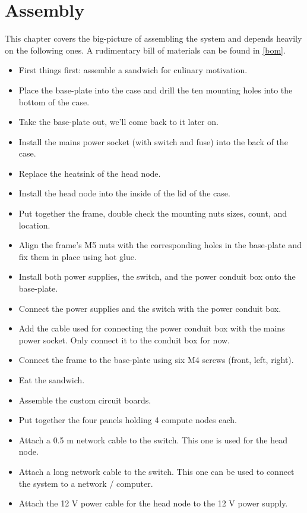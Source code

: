 \chapter{Assembly}

This chapter covers the big-picture of assembling the system and depends heavily on the following ones.
A rudimentary bill of materials can be found in \cref{bom}.

\begin{itemize}
	\item First things first: assemble a sandwich for culinary motivation.
	\item Place the base-plate into the case and drill the ten mounting holes into the bottom of the case.
	\item Take the base-plate out, we'll come back to it later on.
	\item Install the mains power socket (with switch and fuse) into the back of the case.
	\item Replace the heatsink of the head node.
	\item Install the head node into the inside of the lid of the case.
	\item Put together the frame, double check the mounting nuts sizes, count, and location.
	\item Align the frame's M5 nuts with the corresponding holes in the base-plate and fix them in place using hot glue.
	\item Install both power supplies, the switch, and the power conduit box onto the base-plate.
	\item Connect the power supplies and the switch with the power conduit box.
	\item Add the cable used for connecting the power conduit box with the mains power socket.
		Only connect it to the conduit box for now.
	\item Connect the frame to the base-plate using six M4 screws (front, left, right).
	\item Eat the sandwich.
	\item Assemble the custom circuit boards.
	\item Put together the four panels holding 4 compute nodes each.
	\item Attach a 0.5 m network cable to the switch.
		This one is used for the head node.
	\item Attach a long network cable to the switch.
		This one can be used to connect the system to a network / computer.
	\item Attach the 12 V power cable for the head node to the 12 V power supply.

\end{itemize}
